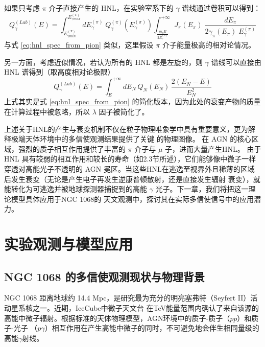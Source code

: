 \documentclass[UTF8]{ctexart}
\begin{document}
如果只考虑 $\pi$ 介子直接产生的 HNL，在实验室系下的 $\gamma$ 谱线通过卷积可以得到：
\begin{equation}
  Q_{\gamma}^{(Lab)} (E) = \int_{E_{\gamma min}^{(\pi)}}^{E_{\gamma max}^{(\pi)}} d E_\gamma^{(\pi)} \; Q_\gamma^{(\pi)}(E_\gamma^{(\pi)}) \int_{\frac{m_\pi E}{2 E_\gamma^{(\pi)}}}
  ^{+\infty} J_\pi (E_\pi) \; \frac{d E_\pi}{2 \gamma_\pi(E_\pi) \; E_\gamma^{(\pi)}}
\end{equation}
与式 \ref{eq:hnl_spec_from_pion} 类似，这里假设 $\pi$ 介子能量极高的相对论情况。

另一方面，考虑近似情况，若认为所有的 HNL 都是左旋的，则 $\gamma$ 谱线可以直接由 HNL 谱得到（取高度相对论极限）
\begin{equation}
  Q_\gamma^{(Lab)} (E) = \int_{E}^{+\infty}d E_N \, Q_N(E_N) \, \frac{2 (E_N - E)}{E_N^2} \label{eq:pure_L_N_gamma}
\end{equation}
上式其实是式 \ref{eq:hnl_spec_from_pion} 的简化版本，因为此处的衰变产物的质量在计算过程中被忽略，所以 $\lambda$ 因子被简化了。

上述关于HNL的产生与衰变机制不仅在粒子物理唯象学中具有重要意义，更为解释极端天体环境中的多信使观测结果提供了关键
的物理图像。
在 AGN 的核心区域，强烈的质子相互作用提供了丰富的 $\pi$ 介子与 $\mu$ 子，进而大量产生HNL。
由于 HNL 具有较弱的相互作用和较长的寿命（如2.3节所述），它们能够像中微子一样穿透对高能光子不透明的 AGN
冕区。当这些HNL在逃逸至视界外且稀薄的区域后发生衰变（无论是产生电子再发生逆康普顿散射，还是直接发生辐射
衰变），就能转化为可逃逸并被地球探测器捕捉到的高能 $\gamma$ 光子。下一章，我们将把这一理论模型具体应用于NGC 1068的
天文观测中，探讨其在实际多信使信号中的应用潜力。

\newpage
\section{实验观测与模型应用}

\subsection{NGC 1068 的多信使观测现状与物理背景}

NGC 1068 距离地球约 14.4 Mpc，是研究最为充分的明亮塞弗特（Seyfert II）活动星系核之一。近期，IceCube中微子天文台
在TeV能量范围内确认了来自该源的高能中微子辐射。根据标准的天体物理模型，AGN环境中的质子-质子（$pp$）和质子-光子
（$p\gamma$）相互作用在产生高能中微子的同时，不可避免地会伴生相同量级的高能$\gamma$射线。
\end{document}
